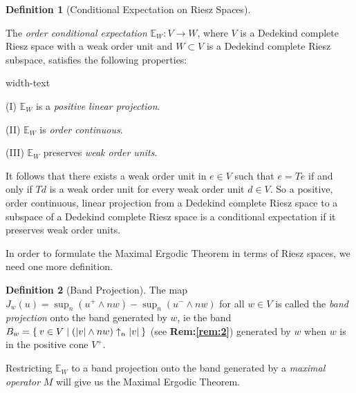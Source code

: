 \documentclass[letterpaper,10pt,oneside,onecolumn,reqno]{amsart}
\newcommand{\E}{\mathbb E}
\theoremstyle{definition}
\newtheorem{defn}{Definition}
\newcommand{\meet}{\wedge}
\begin{document}
\begin{defn}[Conditional Expectation on Riesz Spaces]\label{def:15}

  The \emph{order conditional
    expectation} $\E_W: V \to W$, where $V$ is a Dedekind
  complete Riesz space with a weak order unit and $W \subset V$ is a
  Dedekind complete Riesz subspace, satisfies the following
  properties:

  \begin{deflist}{width-text}
  \item[(I)] $\E_W$ is a \emph{positive linear projection}.
  \item[(II)] $\E_W$ is \emph{order continuous}.
  \item[(III)] $\E_W$ preserves \emph{weak order units}.
  \end{deflist}
\end{defn}

\begin{framed}
  It follows that there exists a weak order unit in $e \in V$ such
  that $e = Te$ if and only if $Td$ is a weak order unit for every
  weak order unit $d \in V$. So a positive, order continuous, linear
  projection from a Dedekind complete Riesz space to a subspace of a
  Dedekind complete Riesz space is a conditional expectation if it
  preserves weak order units.
\end{framed}

In order to formulate the Maximal Ergodic Theorem in terms of Riesz
spaces, we need one more definition.

\begin{defn}[Band Projection]\label{def:16}
  The map $J_w(u) = \sup_n (u^+ \meet nw) - \sup_n(u^- \meet nw)$ for
  all $w \in V$ is called the \emph{band
    projection} onto the band generated by $w$, ie the band $B_w =
  \Set{v \in V | (|v| \meet nw) \uparrow_n |v|}$ (see
  \textbf{Rem:\autoref{rem:2}}) generated by $w$ when $w$ is in the
  positive cone $V^+$.
\end{defn}

Restricting $\E_W$ to a band projection onto the band generated
by a \emph{maximal operator} $M$ will give us
the Maximal Ergodic Theorem.
\end{document}
